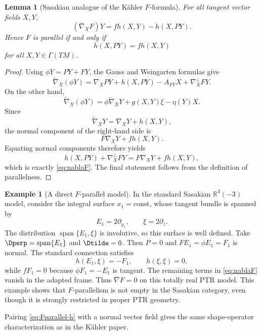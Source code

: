 \documentclass[11pt]{article}
\newtheorem{lemma}[theorem]{Lemma}\newtheorem{corollary}[theorem]{Corollary}
\theoremstyle{definition}\newtheorem{definition}[theorem]{Definition}\newtheorem{example}[theorem]{Example}
\theoremstyle{remark}\newtheorem{remark}[theorem]{Remark}
\begin{document}
\begin{lemma}[Sasakian analogue of the K\"ahler $F$-formula]\label{lem:parallelF}
For all tangent vector fields $X,Y$,
\begin{equation}\label{eq:nablaF}
 (\bar\nabla_XF)Y=f h(X,Y)-h(X,PY).
\end{equation}
Hence $F$ is parallel if and only if
\begin{equation}\label{eq:Fparallel-h}
 h(X,PY)=f h(X,Y)
\end{equation}
for all $X,Y\in\Gamma(TM)$.
\end{lemma}
\begin{proof}
Using $\phi Y=PY+FY$, the Gauss and Weingarten formulas give
\[
 \widetilde\nabla_X(\phi Y)
 =\nabla_XPY+h(X,PY)-A_{FY}X+\nabla_X^\perp FY.
\]
On the other hand,
\[
 \widetilde\nabla_X(\phi Y)
 =\phi\widetilde\nabla_XY+g(X,Y)\xi-\eta(Y)X.
\]
Since
\[
 \widetilde\nabla_XY=\nabla_XY+h(X,Y),
\]
the normal component of the right-hand side is
\[
 F\nabla_XY+f h(X,Y).
\]
Equating normal components therefore yields
\[
 h(X,PY)+\nabla_X^\perp FY=F\nabla_XY+f h(X,Y),
\]
which is exactly \eqref{eq:nablaF}.  The final statement follows from the definition of parallelness.
\end{proof}

\begin{example}[A direct $F$-parallel model]\label{ex:Fparallel-basic}
In the standard Sasakian $\mathbb R^3(-3)$ model, consider the integral
surface \(x_1=\mathrm{const}\), whose tangent bundle is spanned by
\[
 E_1=2\partial_{y_1},\qquad \xi=2\partial_z.
\]
The distribution \(\operatorname{span}\{E_1,\xi\}\) is involutive, so this
surface is well defined.
Take $\Dperp=\operatorname{span}\{E_1\}$ and $\Dtilde=0$.  Then $P=0$ and $FE_1=\phi E_1=F_1$ is normal.  The standard connection satisfies
\[
 h(E_1,\xi)=-F_1,\qquad h(\xi,\xi)=0,
\]
while $fF_1=0$ because $\phi F_1=-E_1$ is tangent.  The remaining terms in \eqref{eq:nablaF} vanish in the adapted frame.  Thus $\bar\nabla F=0$ on this totally real PTR model.  This example shows that $F$-parallelism is not empty in the Sasakian category, even though it is strongly restricted in proper PTR geometry.
\end{example}

Pairing \eqref{eq:Fparallel-h} with a normal vector field gives the same shape-operator characterization as in the K\"ahler paper.
\end{document}
